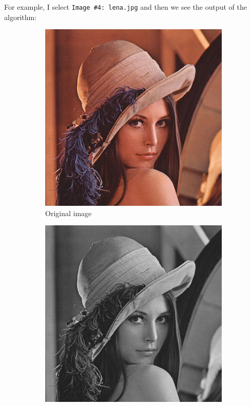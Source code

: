 \documentclass[12pt]{article}
\begin{document}
For example, I select \texttt{Image \#4: lena.jpg} and then we see the output of the algorithm:

\begin{figure}
	\centering
	\begin{subfigure}[b]{0.3\textwidth}
		\centering
		\includegraphics[width=\textwidth]{images/lena}
		\caption{Original image}
		\label{fig:org_lena}
	\end{subfigure}
	\hfill
	\begin{subfigure}[b]{0.3\textwidth}
		\centering
		\includegraphics[width=\textwidth]{images/gray_lena}

\end{subfigure}
\end{figure}
\end{document}
